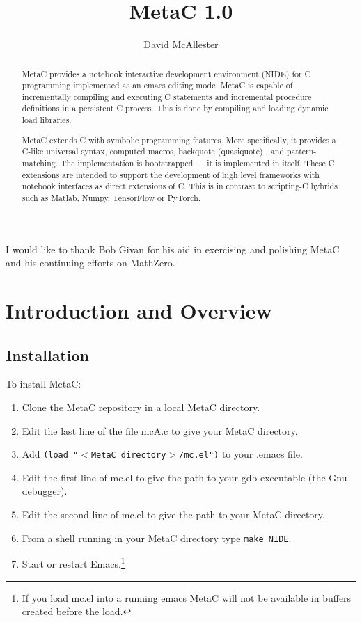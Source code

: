 \documentclass{article}
\title{MetaC 1.0}
\author{David McAllester}
\begin{document}
\maketitle

\begin{abstract}
  MetaC provides a notebook interactive development environment (NIDE) for C programming
  implemented as an emacs editing mode.
  MetaC is capable of incrementally compiling and executing
  C statements and incremental procedure definitions in a persistent C process.
  This is done by compiling and loading dynamic load libraries.

  MetaC extends C with symbolic programming features. More specifically, it provides a C-like universal syntax,
  computed macros, backquote (quasiquote) \cite{backquote}, and pattern-matching.
  The implementation is bootstrapped --- it is implemented in itself.  These C extensions are intended to support the development of high level
  frameworks with notebook interfaces as direct extensions of C.  This is in contrast to scripting-C hybrids such as Matlab, Numpy, TensorFlow or PyTorch.
\end{abstract}

\vfill
{}  I would like to thank Bob Givan for his aid in exercising and polishing MetaC and his continuing efforts on MathZero.
\newpage

\tableofcontents

\newpage

\section{Introduction and Overview}

\subsection{Installation}

\noindent To install MetaC:

\begin{enumerate}
\item Clone the MetaC repository in a local MetaC directory.
\item Edit the last line of the file mcA.c to give your MetaC directory.
\item Add {\tt (load "$<$MetaC directory$>$/mc.el")} to your .emacs file.
\item Edit the first line of  mc.el to give the path to your gdb executable (the Gnu debugger).
\item Edit the second line of mc.el to give the path to your MetaC directory.
\item From a shell running in your MetaC directory type {\tt make NIDE}.
\item Start or restart Emacs.\footnote{If you load mc.el into a running emacs
MetaC will not be available in buffers created before the load.}
\end{enumerate}
\end{document}
